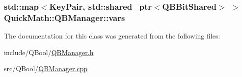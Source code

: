 \subsubsection[{vars}]{\setlength{\rightskip}{0pt plus 5cm}std\+::map$<${\bf Key\+Pair}, std\+::shared\+\_\+ptr$<${\bf Q\+B\+Bit\+Shared}$>$ $>$ Quick\+Math\+::\+Q\+B\+Manager\+::vars\hspace{0.3cm}{\ttfamily [private]}}\label{classQuickMath_1_1QBManager_a0c6ad5951835017e18664c9ec10f67bd}


The documentation for this class was generated from the following files\+:\begin{DoxyCompactItemize}
\item 
include/\+Q\+Bool/\hyperlink{QBManager_8h}{Q\+B\+Manager.\+h}\item 
src/\+Q\+Bool/\hyperlink{QBManager_8cpp}{Q\+B\+Manager.\+cpp}\end{DoxyCompactItemize}
